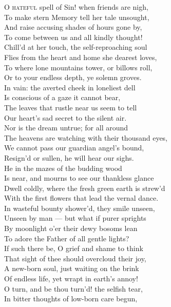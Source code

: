 \textsc{O hateful} spell of Sin! when friends are nigh, \\
 To make stern Memory tell her tale unsought, \\
 And raise accusing shades of hours gone by, \\
 To come between us and all kindly thought! \\
  Chill’d at her touch, the self-reproaching soul \\
 Flies from the heart and home she dearest loves, \\
 To where lone mountains tower, or billows roll, \\
 Or to your endless depth, ye solemn groves. \\
  In vain: the averted cheek in loneliest dell \\
 Is conscious of a gaze it cannot bear, \\
 The leaves that rustle near us seem to tell \\
 Our heart’s sad secret to the silent air. \\
  Nor is the dream untrue; for all around \\
 The heavens are watching with their thousand eyes, \\
 We cannot pass our guardian angel’s bound, \\
 Resign’d or sullen, he will hear our sighs. \\
  He in the mazes of the budding wood \\
 Is near, and mourns to see our thankless glance \\
 Dwell coldly, where the fresh green earth is strew’d \\
 With the first flowers that lead the vernal dance. \\
  In wasteful bounty shower’d, they smile unseen, \\
 Unseen by man — but what if purer sprights \\
 By moonlight o’er their dewy bosoms lean \\
 To adore the Father of all gentle lights? \\
  If such there be, O grief and shame to think \\
 That sight of thee should overcloud their joy, \\
 A new-born soul, just waiting on the brink \\
 Of endless life, yet wrapt in earth’s annoy! \\
  O turn, and be thou turn’d! the selfish tear, \\
 In bitter thoughts of low-born care begun, \\
